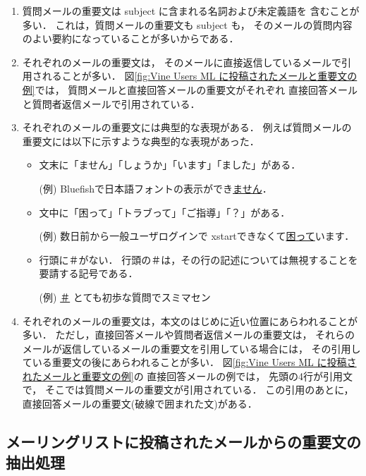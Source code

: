   \begin{enumerate}
   \item 質問メールの重要文は subject に含まれる名詞および未定義語を
	 含むことが多い．
	 これは，質問メールの重要文も subject も，
	 そのメールの質問内容のよい要約になっていることが多いからである．

   \item それぞれのメールの重要文は，
	 そのメールに直接返信しているメールで引用されることが多い．
	 図\ref{fig:Vine Users ML に投稿されたメールと重要文の例}では，
	 質問メールと直接回答メールの重要文がそれぞれ
	 直接回答メールと質問者返信メールで引用されている．


   \item それぞれのメールの重要文には典型的な表現がある．
	 例えば質問メールの重要文には以下に示すような典型的な表現があった．
	 \begin{itemize}
	  \item 文末に「ません」「しょうか」「います」「ました」がある．

		(例) Bluefishで日本語フォントの表示ができ\underline{ません}．
		
	  \item 文中に「困って」「トラブって」「ご指導」「？」がある．

		(例) 数日前から一般ユーザログインで
		xstartできなくて\underline{困って}います．
		
	  \item 行頭に＃がない．
		行頭の＃は，その行の記述については無視することを
		要請する記号である．

		(例) \underline{＃} とても初歩な質問でスミマセン
	 \end{itemize}

   \item それぞれのメールの重要文は，本文のはじめに近い位置にあらわれることが多い．
	 ただし，直接回答メールや質問者返信メールの重要文は，
	 それらのメールが返信しているメールの重要文を引用している場合には，
	 その引用している重要文の後にあらわれることが多い．
	 図\ref{fig:Vine Users ML に投稿されたメールと重要文の例}の
	 直接回答メールの例では，
	 先頭の4行が引用文で，
	 そこでは質問メールの重要文が引用されている．
	 この引用のあとに，直接回答メールの重要文(破線で囲まれた文)がある．
  \end{enumerate}  


 \subsection{メーリングリストに投稿されたメールからの重要文の抽出処理}

